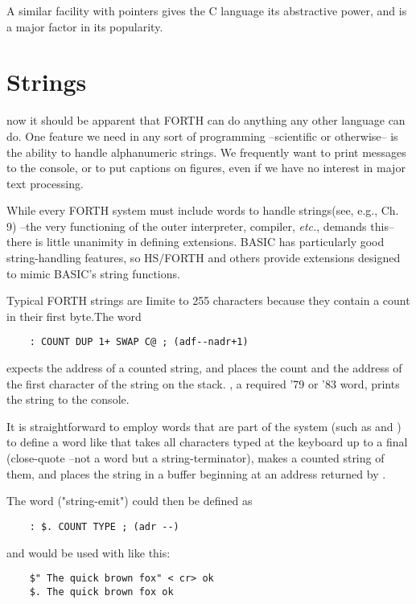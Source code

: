 A similar facility with pointers gives the C language its abstractive power, and is a major factor in its popularity.

\section{Strings}

 now it should be apparent that FORTH can do anything any other language can do. One feature we need in any sort of programming --scientific or otherwise-- is the ability to handle alphanumeric strings. We frequently want to print messages to the console, or to put captions on figures, even if we have no interest in major text processing.

While every FORTH system must include words to handle strings(see, e.g., \FTR Ch. 9) --the very functioning of the outer interpreter, compiler, \textit{etc.}, demands this-- there is little unanimity in defining extensions. BASIC has particularly good string-handling features, so HS/FORTH and others provide extensions designed to mimic BASIC’s string functions.

Typical FORTH strings are Iimite to 255 characters because they contain a count in their first byte.The word 
\begin{lstlisting}
    : COUNT DUP 1+ SWAP C@ ; (adf--nadr+1)
\end{lstlisting}

expects the address of a counted string, and places the count and
the address of the first character of the string on the stack. , a required '79 or '83 word, prints the string to the console.

It is straightforward to employ words that are part of the system (such as  and ) to define a word like  that takes all characters typed at the keyboard up to a final  (close-quote --not a word but a string-terminator), makes a counted string of them, and places the string in a buffer beginning at an address returned by .

The word  ("string-emit") could then be defined as
\begin{lstlisting}
    : $. COUNT TYPE ; (adr --)
\end{lstlisting}

and would be used with  like this:
\begin{lstlisting}
    $" The quick brown fox" < cr> ok
    $. The quick brown fox ok
\end{lstlisting}

